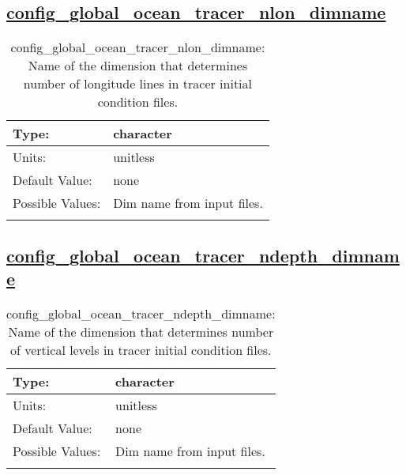 \subsection[config\_global\_ocean\_tracer\_nlon\_dimname]{\hyperref[sec:nm_tab_global_ocean]{config\_global\_ocean\_tracer\_nlon\_dimname}}
\label{subsec:nm_sec_config_global_ocean_tracer_nlon_dimname}
\begin{center}
\begin{longtable}{| p{2.0in} || p{4.0in} |}
    \hline
    Type: & character \\
    \hline
    Units: & \si{unitless} \\
    \hline
    Default Value: & none \\
    \hline
    Possible Values: & Dim name from input files. \\
    \hline
    \caption{config\_global\_ocean\_tracer\_nlon\_dimname: Name of the dimension that determines number of longitude lines in tracer initial condition files.}
\end{longtable}
\end{center}
\subsection[config\_global\_ocean\_tracer\_ndepth\_dimname]{\hyperref[sec:nm_tab_global_ocean]{config\_global\_ocean\_tracer\_ndepth\_dimname}}
\label{subsec:nm_sec_config_global_ocean_tracer_ndepth_dimname}
\begin{center}
\begin{longtable}{| p{2.0in} || p{4.0in} |}
    \hline
    Type: & character \\
    \hline
    Units: & \si{unitless} \\
    \hline
    Default Value: & none \\
    \hline
    Possible Values: & Dim name from input files. \\
    \hline
    \caption{config\_global\_ocean\_tracer\_ndepth\_dimname: Name of the dimension that determines number of vertical levels in tracer initial condition files.}
\end{longtable}
\end{center}
